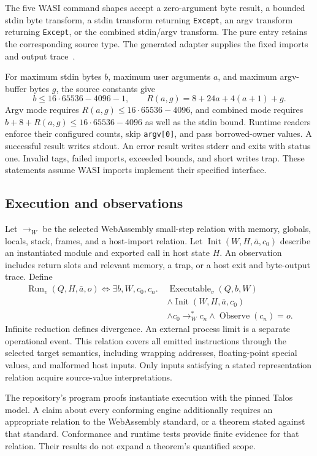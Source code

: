 \documentclass[11pt]{article}
\newcommand{\code}[1]{\texttt{#1}}
\begin{document}
The five WASI command shapes accept a zero-argument byte result, a bounded stdin byte transform, a stdin transform returning \code{Except}, an argv transform returning \code{Except}, or the combined stdin/argv transform.  The pure entry retains the corresponding source type.  The generated adapter supplies the fixed imports and output trace~\cite{binary,specification}.

For maximum stdin bytes $b$, maximum user arguments $a$, and maximum argv-buffer bytes $g$, the source constants give
\[
b\le16\cdot65536-4096-1,
\qquad R(a,g)=8+24a+4(a+1)+g.
\]
Argv mode requires $R(a,g)\le16\cdot65536-4096$, and combined mode requires $b+8+R(a,g)\le16\cdot65536-4096$ as well as the stdin bound.  Runtime readers enforce their configured counts, skip \code{argv[0]}, and pass borrowed-owner values.  A successful result writes stdout.  An error result writes stderr and exits with status one.  Invalid tags, failed imports, exceeded bounds, and short writes trap.  These statements assume WASI imports implement their specified interface.

\subsection{Execution and observations}

Let $\longrightarrow_W$ be the selected WebAssembly small-step relation with memory, globals, locals, stack, frames, and a host-import relation.  Let $\operatorname{Init}(W,H,\bar a,c_0)$ describe an instantiated module and exported call in host state $H$.  An observation includes return slots and relevant memory, a trap, or a host exit and byte-output trace.  Define
\begin{align*}
\operatorname{Run}_v(Q,H,\bar a,o)\iff\exists b,W,c_0,c_n.\;&
\operatorname{Executable}_v(Q,b,W)\\
&\land\operatorname{Init}(W,H,\bar a,c_0)\\
&\land c_0\longrightarrow_W^*c_n
\land\operatorname{Observe}(c_n)=o.
\end{align*}
Infinite reduction defines divergence.  An external process limit is a separate operational event.  This relation covers all emitted instructions through the selected target semantics, including wrapping addresses, floating-point special values, and malformed host inputs.  Only inputs satisfying a stated representation relation acquire source-value interpretations.

The repository's program proofs instantiate execution with the pinned Talos model.  A claim about every conforming engine additionally requires an appropriate relation to the WebAssembly standard, or a theorem stated against that standard.  Conformance and runtime tests provide finite evidence for that relation.  Their results do not expand a theorem's quantified scope.
\end{document}
